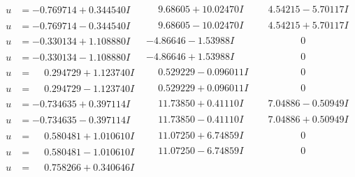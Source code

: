 \documentclass[1p]{elsarticle_modified}
\theoremstyle{definition}
\begin{document}
$$\begin{array}{c|c|c}
 \hline 
\begin{aligned}
u &= -0.769714 + 0.344540 I\end{aligned}
 & \phantom{-}9.68605 + 10.02470 I & \phantom{-}4.54215 - 5.70117 I \\ \hline\begin{aligned}
u &= -0.769714 - 0.344540 I\end{aligned}
 & \phantom{-}9.68605 - 10.02470 I & \phantom{-}4.54215 + 5.70117 I \\ \hline\begin{aligned}
u &= -0.330134 + 1.108880 I\end{aligned}
 & -4.86646 - 1.53988 I & \phantom{-0.000000 } 0 \\ \hline\begin{aligned}
u &= -0.330134 - 1.108880 I\end{aligned}
 & -4.86646 + 1.53988 I & \phantom{-0.000000 } 0 \\ \hline\begin{aligned}
u &= \phantom{-}0.294729 + 1.123740 I\end{aligned}
 & \phantom{-}0.529229 - 0.096011 I & \phantom{-0.000000 } 0 \\ \hline\begin{aligned}
u &= \phantom{-}0.294729 - 1.123740 I\end{aligned}
 & \phantom{-}0.529229 + 0.096011 I & \phantom{-0.000000 } 0 \\ \hline\begin{aligned}
u &= -0.734635 + 0.397114 I\end{aligned}
 & \phantom{-}11.73850 + 0.41110 I & \phantom{-}7.04886 - 0.50949 I \\ \hline\begin{aligned}
u &= -0.734635 - 0.397114 I\end{aligned}
 & \phantom{-}11.73850 - 0.41110 I & \phantom{-}7.04886 + 0.50949 I \\ \hline\begin{aligned}
u &= \phantom{-}0.580481 + 1.010610 I\end{aligned}
 & \phantom{-}11.07250 + 6.74859 I & \phantom{-0.000000 } 0 \\ \hline\begin{aligned}
u &= \phantom{-}0.580481 - 1.010610 I\end{aligned}
 & \phantom{-}11.07250 - 6.74859 I & \phantom{-0.000000 } 0 \\ \hline\begin{aligned}
u &= \phantom{-}0.758266 + 0.340646 I\end{aligned}

\end{array}$$
\end{document}
